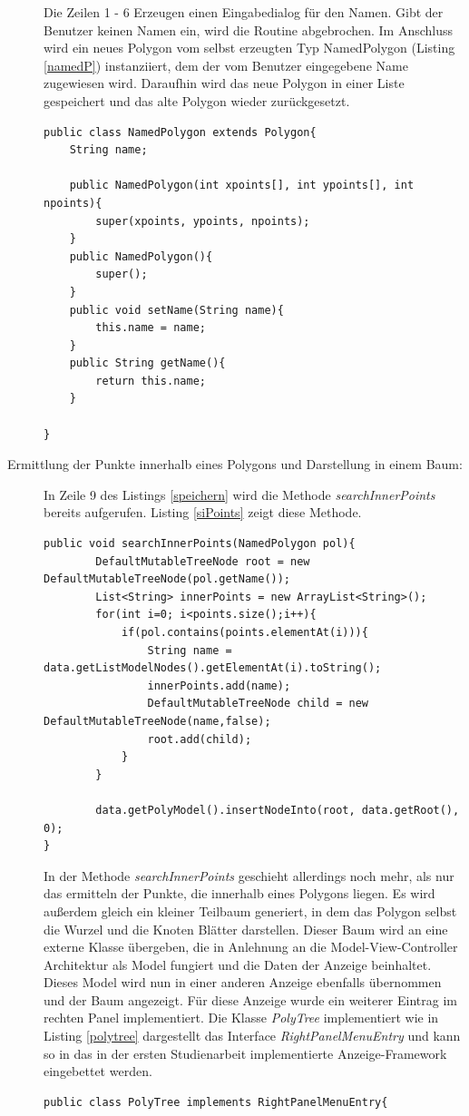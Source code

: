 \begin{description}
Die Zeilen 1 - 6 Erzeugen einen Eingabedialog für den Namen. Gibt der Benutzer keinen Namen ein, wird die Routine abgebrochen. Im Anschluss wird ein neues Polygon vom selbst erzeugten Typ NamedPolygon (Listing \ref{namedP}) instanziiert, dem der vom Benutzer eingegebene Name zugewiesen wird. Daraufhin wird das neue Polygon in einer Liste gespeichert und das alte Polygon wieder zurückgesetzt. 
\begin{lstlisting}[captionpos=b, caption=Klassendefinition des NamedPolygon, label=namedP]
public class NamedPolygon extends Polygon{
    String name;

    public NamedPolygon(int xpoints[], int ypoints[], int npoints){
        super(xpoints, ypoints, npoints);
    }
    public NamedPolygon(){
        super();
    }
    public void setName(String name){
        this.name = name;
    }
    public String getName(){
        return this.name;
    }

}
\end{lstlisting}
\newpage
\item[Ermittlung der Punkte innerhalb eines Polygons und Darstellung in einem Baum:] In Zeile 9 des Listings \ref{speichern} wird die Methode \emph{searchInnerPoints} bereits aufgerufen. Listing \ref{siPoints} zeigt diese Methode.
\begin{lstlisting}[captionpos=b, caption=Methode searchInnerPoints, label=siPoints]
public void searchInnerPoints(NamedPolygon pol){
        DefaultMutableTreeNode root = new DefaultMutableTreeNode(pol.getName());
        List<String> innerPoints = new ArrayList<String>();
        for(int i=0; i<points.size();i++){
            if(pol.contains(points.elementAt(i))){
                String name = data.getListModelNodes().getElementAt(i).toString();
                innerPoints.add(name);
                DefaultMutableTreeNode child = new DefaultMutableTreeNode(name,false);
                root.add(child);
            }
        }
        
        data.getPolyModel().insertNodeInto(root, data.getRoot(), 0);
}
\end{lstlisting}

In der Methode \emph{searchInnerPoints} geschieht allerdings noch mehr, als nur das ermitteln der Punkte, die innerhalb eines Polygons liegen. Es wird außerdem gleich ein kleiner Teilbaum generiert, in dem das Polygon  selbst die Wurzel und die Knoten Blätter darstellen. Dieser Baum wird an eine externe Klasse übergeben, die in Anlehnung an die Model-View-Controller Architektur als Model fungiert und die Daten der Anzeige beinhaltet. Dieses Model wird nun in einer anderen Anzeige ebenfalls übernommen und der Baum angezeigt. Für diese Anzeige wurde ein weiterer Eintrag im rechten Panel implementiert. Die Klasse \emph{PolyTree} implementiert wie in Listing \ref{polytree} dargestellt das Interface \emph{RightPanelMenuEntry} und kann so in das in der ersten Studienarbeit implementierte Anzeige-Framework eingebettet werden.
\begin{lstlisting}[captionpos=b, caption=Klasse PolyTree, label=polytree]
public class PolyTree implements RightPanelMenuEntry{


\end{lstlisting}
\end{description}
